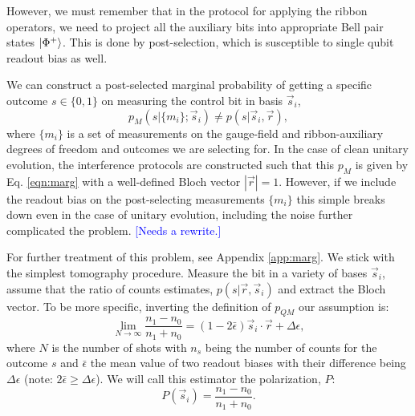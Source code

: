\documentclass[two column]{article}
\newcommand{\jovan}[1]{\textcolor{blue}{[#1]}}
\begin{document}
However, we must remember that in the protocol for applying the ribbon operators, we need to project all the auxiliary bits into appropriate Bell pair states $\ket{\Phi^+}$.
This is done by post-selection, which is susceptible to single qubit readout bias as well.

We can construct a post-selected marginal probability of getting a specific outcome $s \in \{0, 1\}$ on measuring the control bit in basis $\vec{s}_i$, $$p_M(s |\{m_i\}; \vec{s}_i) \neq p(s|\vec{s}_i, \vec{r}) ,$$ where $\{m_i\}$ is a set of measurements on the gauge-field and ribbon-auxiliary degrees of freedom and outcomes we are selecting for.
In the case of clean unitary evolution, the interference protocols are constructed such that this $p_M$ is given by Eq. \ref{eqn:marg} with a well-defined Bloch vector $|\vec{r}| = 1$.
However, if we include the readout bias on the post-selecting measurements $\{m_i\}$ this simple breaks down even in the case of unitary evolution, including the noise further complicated the problem. \jovan{Needs a rewrite.}

For further treatment of this problem, see Appendix \ref{app:marg}.
We stick with the simplest tomography procedure.
Measure the bit in a variety of bases $\vec{s}_i$, assume that the ratio of counts estimates, $p(s|\vec{r}, \vec{s}_i)$ and extract the Bloch vector.
To be more specific, inverting the definition of $p_{QM}$ our assumption is:
\begin{equation}
    \lim_{N \rightarrow \infty} \frac{n_1-n_0}{n_1+n_0} = (1-2\bar\epsilon)\vec{s}_i \cdot \vec{r} + \Delta\epsilon,\label{eqn:estim}
\end{equation}
where $N$ is the number of shots with $n_s$ being the number of counts for the outcome $s$ and $\bar\epsilon$ the mean value of two readout biases with their difference being $\Delta\epsilon$ (note: $2\bar\epsilon \geq \Delta\epsilon$).
We will call this estimator the polarization, $P$:
\begin{equation}
    P(\vec{s}_i) = \frac{n_1-n_0}{n_1+n_0}.
\end{equation}
\end{document}
